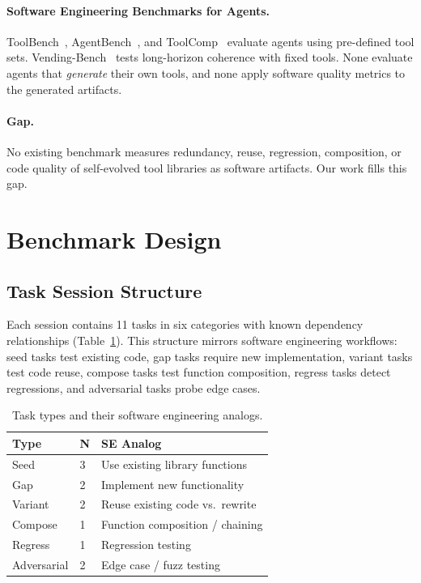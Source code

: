 \documentclass[]{ceurart}
\begin{document}
\paragraph{Software Engineering Benchmarks for Agents.} ToolBench~\cite{qin2023toolbench}, AgentBench~\cite{liu2024agentbench}, and ToolComp~\cite{toolcomp2025} evaluate agents using pre-defined tool sets. Vending-Bench~\cite{backlund2025vendingbench} tests long-horizon coherence with fixed tools. None evaluate agents that \emph{generate} their own tools, and none apply software quality metrics to the generated artifacts.

\paragraph{Gap.} No existing benchmark measures redundancy, reuse, regression, composition, or code quality of self-evolved tool libraries as software artifacts. Our work fills this gap.

\section{Benchmark Design}

\subsection{Task Session Structure}

Each session contains 11 tasks in six categories with known dependency relationships (Table~\ref{tab:task_types}). This structure mirrors software engineering workflows: seed tasks test existing code, gap tasks require new implementation, variant tasks test code reuse, compose tasks test function composition, regress tasks detect regressions, and adversarial tasks probe edge cases.

\begin{table}[t]
\centering
\small
\begin{tabular}{llp{4.5cm}}
\toprule
\textbf{Type} & \textbf{N} & \textbf{SE Analog} \\
\midrule
Seed & 3 & Use existing library functions \\
Gap & 2 & Implement new functionality \\
Variant & 2 & Reuse existing code vs.\ rewrite \\
Compose & 1 & Function composition / chaining \\
Regress & 1 & Regression testing \\
Adversarial & 2 & Edge case / fuzz testing \\
\bottomrule
\end{tabular}
\caption{Task types and their software engineering analogs.}
\label{tab:task_types}
\end{table}
\end{document}
